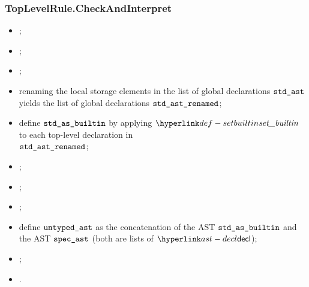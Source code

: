 \subsubsection{TopLevelRule.CheckAndInterpret\label{sec:TopLevelRule.CheckAndInterpret}}
\ProseParagraph
\AllApply
\begin{itemize}
    \item \Proseaslscan{$\vstdtext$}{$\spectoken$}{$\vstdtokens$\ProseTerminateAs{\LexicalErrorConfig}};
    \item \Proseaslparse{$\vstdtokens$}{$\vstdparse$\ProseTerminateAs{\ParseErrorConfig}};
    \item \Prosebuildast{$\vstdparse$}{$\vstdast$\ProseTerminateAs{\BuildErrorConfig}};
    \item renaming the local storage elements in the list of global declarations $\vstdast$ yields the list of global declarations $\texttt{std\_ast\_renamed}$;
    \item define $\texttt{std\_as\_builtin}$ by applying $\setbuiltin$ to each top-level declaration in\\
          $\texttt{std\_ast\_renamed}$\ProseTerminateAs{\BuildErrorConfig};
    \item \Proseaslscan{$\vspectext$}{$\spectoken$}{$\vspectokens$\ProseTerminateAs{\LexicalErrorConfig}};
    \item \Proseaslparse{$\vspectokens$}{$\vspecparse$\ProseTerminateAs{\ParseErrorConfig}};
    \item \Prosebuildast{$\vspecparse$}{$\vspecast$\ProseTerminateAs{\BuildErrorConfig}};
    \item define $\texttt{untyped\_ast}$ as the concatenation of the AST $\texttt{std\_as\_builtin}$ and
          the AST $\vspecast$ (both are lists of $\decl$);
    \item {};
    \item {}.
\end{itemize}


